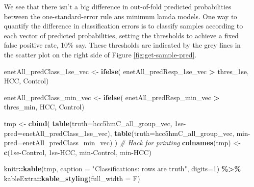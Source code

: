 \documentclass[
]{book}
\newenvironment{Shaded}{\begin{snugshade}}{\end{snugshade}}
\newcommand{\CommentTok}[1]{\textcolor[rgb]{0.56,0.35,0.01}{\textit{#1}}}
\newcommand{\DataTypeTok}[1]{\textcolor[rgb]{0.13,0.29,0.53}{#1}}
\newcommand{\DecValTok}[1]{\textcolor[rgb]{0.00,0.00,0.81}{#1}}
\newcommand{\KeywordTok}[1]{\textcolor[rgb]{0.13,0.29,0.53}{\textbf{#1}}}
\newcommand{\NormalTok}[1]{#1}
\newcommand{\OperatorTok}[1]{\textcolor[rgb]{0.81,0.36,0.00}{\textbf{#1}}}
\newcommand{\StringTok}[1]{\textcolor[rgb]{0.31,0.60,0.02}{#1}}
\begin{document}
We see that there isn't a big difference in out-of-fold predicted
probabilities between the one-standard-error rule ans minimum lamda models.
One way to quantify
the difference in classification errors is to classify samples
according to each vector of predicted probabilities, setting
the thresholds to achieve a fixed false positive rate, 10\% say.
These thresholds are indicated by the grey lines in the scatter plot
on the right side of Figure \ref{fig:get-sample-pred}.

\begin{Shaded}
\begin{Highlighting}[]
\NormalTok{enetAll\_predClass\_1se\_vec <{-}}\StringTok{ }\KeywordTok{ifelse}\NormalTok{(}
\NormalTok{ enetAll\_predResp\_1se\_vec }\OperatorTok{>}\StringTok{ }\NormalTok{thres\_1se, }\StringTok{\textquotesingle{}HCC\textquotesingle{}}\NormalTok{, }\StringTok{\textquotesingle{}Control\textquotesingle{}}\NormalTok{)}

\NormalTok{enetAll\_predClass\_min\_vec <{-}}\StringTok{ }\KeywordTok{ifelse}\NormalTok{(}
\NormalTok{ enetAll\_predResp\_min\_vec }\OperatorTok{>}\StringTok{ }\NormalTok{thres\_min, }\StringTok{\textquotesingle{}HCC\textquotesingle{}}\NormalTok{, }\StringTok{\textquotesingle{}Control\textquotesingle{}}\NormalTok{)}

\NormalTok{tmp <{-}}\StringTok{ }\KeywordTok{cbind}\NormalTok{(}
 \KeywordTok{table}\NormalTok{(}\DataTypeTok{truth=}\NormalTok{hcc5hmC\_all\_group\_vec, }\StringTok{\textasciigrave{}}\DataTypeTok{1se{-}pred}\StringTok{\textasciigrave{}}\NormalTok{=enetAll\_predClass\_1se\_vec),}
 \KeywordTok{table}\NormalTok{(}\DataTypeTok{truth=}\NormalTok{hcc5hmC\_all\_group\_vec, }\StringTok{\textasciigrave{}}\DataTypeTok{min{-}pred}\StringTok{\textasciigrave{}}\NormalTok{=enetAll\_predClass\_min\_vec)}
\NormalTok{) }
\CommentTok{\# Hack for printing}
\KeywordTok{colnames}\NormalTok{(tmp) <{-}}\StringTok{ }\KeywordTok{c}\NormalTok{(}\StringTok{\textquotesingle{}1se{-}Control\textquotesingle{}}\NormalTok{, }\StringTok{\textquotesingle{}1se{-}HCC\textquotesingle{}}\NormalTok{, }\StringTok{\textquotesingle{}min{-}Control\textquotesingle{}}\NormalTok{, }\StringTok{\textquotesingle{}min{-}HCC\textquotesingle{}}\NormalTok{)}

\NormalTok{knitr}\OperatorTok{::}\KeywordTok{kable}\NormalTok{(tmp,}
  \DataTypeTok{caption =} \StringTok{"Classifications: rows are truth"}\NormalTok{,}
  \DataTypeTok{digits=}\DecValTok{1}\NormalTok{) }\OperatorTok{\%>\%}
\StringTok{   }\NormalTok{kableExtra}\OperatorTok{::}\KeywordTok{kable\_styling}\NormalTok{(}\DataTypeTok{full\_width =}\NormalTok{ F)}
\end{Highlighting}
\end{Shaded}
\end{document}
